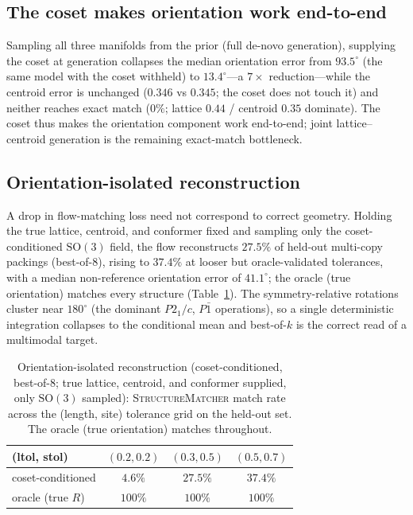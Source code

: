 \documentclass[journal=jcisd8,manuscript=article]{achemso}
\begin{document}
\subsection{The coset makes orientation work end-to-end}\label{sec:e2e}
Sampling all three manifolds from the prior (full de-novo generation), supplying
the coset at generation collapses the median orientation error from $93.5^\circ$
(the same model with the coset withheld) to $13.4^\circ$---a $7\times$
reduction---while the centroid error is unchanged ($0.346$ vs $0.345$; the coset
does not touch it) and neither reaches exact match ($0\%$; lattice $0.44$ /
centroid $0.35$ dominate). The coset thus makes the orientation component work
end-to-end; joint lattice--centroid generation is the remaining exact-match
bottleneck.

\subsection{Orientation-isolated reconstruction}\label{sec:orientiso}
A drop in flow-matching loss need not correspond to correct geometry. Holding the
true lattice, centroid, and conformer fixed and sampling only the coset-conditioned
$\mathrm{SO}(3)$ field, the flow reconstructs $27.5\%$ of held-out multi-copy
packings (best-of-$8$), rising to $37.4\%$ at looser but oracle-validated
tolerances, with a median non-reference orientation error of $41.1^\circ$; the
oracle (true orientation) matches every structure (Table~\ref{tab:tolsweep}). The
symmetry-relative rotations cluster near $180^\circ$ (the dominant $P2_1/c$,
$P\bar1$ operations)\cite{groom2016csd}, so a single deterministic integration
collapses to the conditional mean and best-of-$k$ is the correct read of a
multimodal target.

\begin{table}[t]\centering
\caption{Orientation-isolated reconstruction (coset-conditioned, best-of-$8$; true
lattice, centroid, and conformer supplied, only $\mathrm{SO}(3)$ sampled):
\textsc{StructureMatcher} match rate across the (length, site) tolerance grid on
the held-out set. The oracle (true orientation) matches throughout.}
\label{tab:tolsweep}
\begin{tabular}{lccc}\toprule
(ltol, stol) & $(0.2,0.2)$ & $(0.3,0.5)$ & $(0.5,0.7)$ \\\midrule
coset-conditioned & $4.6\%$  & $27.5\%$ & $37.4\%$ \\
oracle (true $R$) & $100\%$  & $100\%$  & $100\%$  \\\bottomrule
\end{tabular}
\end{table}
\end{document}
